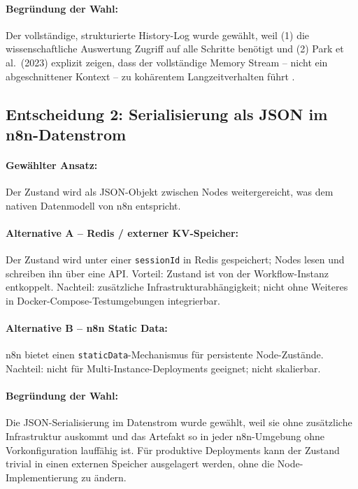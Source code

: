 \documentclass[12pt,a4paper,oneside]{report}
\begin{document}
\paragraph{Begründung der Wahl:}
Der vollständige, strukturierte History-Log wurde gewählt, weil (1) die wissenschaftliche
Auswertung Zugriff auf alle Schritte benötigt und (2) Park et al.\ (2023) explizit
zeigen, dass der vollständige Memory Stream -- nicht ein abgeschnittener Kontext --
zu kohärentem Langzeitverhalten führt \cite{park2023generative}.

\subsection{Entscheidung 2: Serialisierung als JSON im n8n-Datenstrom}

\paragraph{Gewählter Ansatz:}
Der Zustand wird als \ac{JSON}-Objekt zwischen Nodes weitergereicht, was dem nativen
Datenmodell von n8n entspricht.

\paragraph{Alternative A -- Redis / externer KV-Speicher:}
Der Zustand wird unter einer \texttt{sessionId} in Redis gespeichert; Nodes lesen
und schreiben ihn über eine \ac{API}. Vorteil: Zustand ist von der Workflow-Instanz
entkoppelt. Nachteil: zusätzliche Infrastrukturabhängigkeit; nicht ohne Weiteres
in Docker-Compose-Testumgebungen integrierbar.

\paragraph{Alternative B -- n8n Static Data:}
n8n bietet einen \texttt{staticData}-Mechanismus für persistente Node-Zustände.
Nachteil: nicht für Multi-Instance-Deployments geeignet; nicht skalierbar.

\paragraph{Begründung der Wahl:}
Die JSON-Serialisierung im Datenstrom wurde gewählt, weil sie ohne zusätzliche
Infrastruktur auskommt und das Artefakt so in jeder n8n-Umgebung ohne Vorkonfiguration
lauffähig ist. Für produktive Deployments kann der Zustand trivial in einen externen
Speicher ausgelagert werden, ohne die Node-Implementierung zu ändern.
\end{document}
